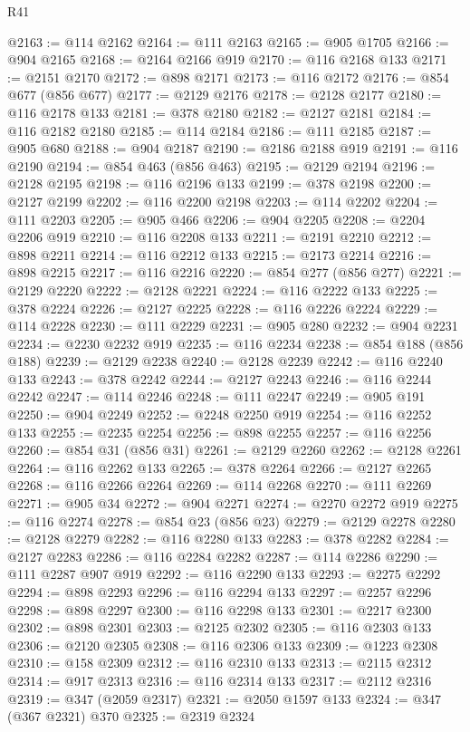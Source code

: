 \begin{lexlean}{R41}
\begin{coremodule}
@2163 := @114 @2162
@2164 := @111 @2163
@2165 := @905 @1705
@2166 := @904 @2165
@2168 := @2164 @2166 @919
@2170 := @116 @2168 @133
@2171 := @2151 @2170
@2172 := @898 @2171
@2173 := @116 @2172
@2176 := @854 @677 (@856 @677)
@2177 := @2129 @2176
@2178 := @2128 @2177
@2180 := @116 @2178 @133
@2181 := @378 @2180
@2182 := @2127 @2181
@2184 := @116 @2182 @2180
@2185 := @114 @2184
@2186 := @111 @2185
@2187 := @905 @680
@2188 := @904 @2187
@2190 := @2186 @2188 @919
@2191 := @116 @2190
@2194 := @854 @463 (@856 @463)
@2195 := @2129 @2194
@2196 := @2128 @2195
@2198 := @116 @2196 @133
@2199 := @378 @2198
@2200 := @2127 @2199
@2202 := @116 @2200 @2198
@2203 := @114 @2202
@2204 := @111 @2203
@2205 := @905 @466
@2206 := @904 @2205
@2208 := @2204 @2206 @919
@2210 := @116 @2208 @133
@2211 := @2191 @2210
@2212 := @898 @2211
@2214 := @116 @2212 @133
@2215 := @2173 @2214
@2216 := @898 @2215
@2217 := @116 @2216
@2220 := @854 @277 (@856 @277)
@2221 := @2129 @2220
@2222 := @2128 @2221
@2224 := @116 @2222 @133
@2225 := @378 @2224
@2226 := @2127 @2225
@2228 := @116 @2226 @2224
@2229 := @114 @2228
@2230 := @111 @2229
@2231 := @905 @280
@2232 := @904 @2231
@2234 := @2230 @2232 @919
@2235 := @116 @2234
@2238 := @854 @188 (@856 @188)
@2239 := @2129 @2238
@2240 := @2128 @2239
@2242 := @116 @2240 @133
@2243 := @378 @2242
@2244 := @2127 @2243
@2246 := @116 @2244 @2242
@2247 := @114 @2246
@2248 := @111 @2247
@2249 := @905 @191
@2250 := @904 @2249
@2252 := @2248 @2250 @919
@2254 := @116 @2252 @133
@2255 := @2235 @2254
@2256 := @898 @2255
@2257 := @116 @2256
@2260 := @854 @31 (@856 @31)
@2261 := @2129 @2260
@2262 := @2128 @2261
@2264 := @116 @2262 @133
@2265 := @378 @2264
@2266 := @2127 @2265
@2268 := @116 @2266 @2264
@2269 := @114 @2268
@2270 := @111 @2269
@2271 := @905 @34
@2272 := @904 @2271
@2274 := @2270 @2272 @919
@2275 := @116 @2274
@2278 := @854 @23 (@856 @23)
@2279 := @2129 @2278
@2280 := @2128 @2279
@2282 := @116 @2280 @133
@2283 := @378 @2282
@2284 := @2127 @2283
@2286 := @116 @2284 @2282
@2287 := @114 @2286
@2290 := @111 @2287 @907 @919
@2292 := @116 @2290 @133
@2293 := @2275 @2292
@2294 := @898 @2293
@2296 := @116 @2294 @133
@2297 := @2257 @2296
@2298 := @898 @2297
@2300 := @116 @2298 @133
@2301 := @2217 @2300
@2302 := @898 @2301
@2303 := @2125 @2302
@2305 := @116 @2303 @133
@2306 := @2120 @2305
@2308 := @116 @2306 @133
@2309 := @1223 @2308
@2310 := @158 @2309
@2312 := @116 @2310 @133
@2313 := @2115 @2312
@2314 := @917 @2313
@2316 := @116 @2314 @133
@2317 := @2112 @2316
@2319 := @347 (@2059 @2317)
@2321 := @2050 @1597 @133
@2324 := @347 (@367 @2321) @370
@2325 := @2319 @2324

\end{coremodule}
\end{lexlean}

